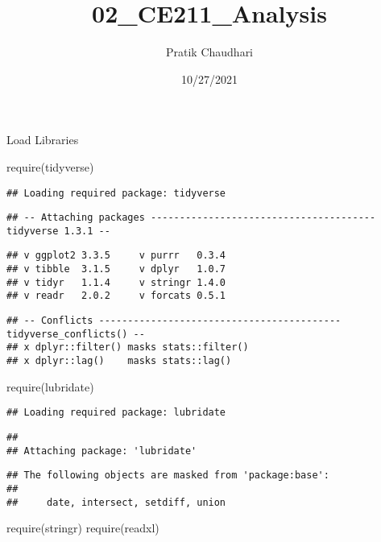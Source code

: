 \documentclass[
]{article}
\title{02\_CE211\_Analysis}
\author{Pratik Chaudhari}
\date{10/27/2021}
\newenvironment{Shaded}{\begin{snugshade}}{\end{snugshade}}
\newcommand{\FunctionTok}[1]{\textcolor[rgb]{0.00,0.00,0.00}{#1}}
\newcommand{\NormalTok}[1]{#1}
\begin{document}
\maketitle

Load Libraries

\begin{Shaded}
\begin{Highlighting}[]
\FunctionTok{require}\NormalTok{(tidyverse)}
\end{Highlighting}
\end{Shaded}

\begin{verbatim}
## Loading required package: tidyverse
\end{verbatim}

\begin{verbatim}
## -- Attaching packages --------------------------------------- tidyverse 1.3.1 --
\end{verbatim}

\begin{verbatim}
## v ggplot2 3.3.5     v purrr   0.3.4
## v tibble  3.1.5     v dplyr   1.0.7
## v tidyr   1.1.4     v stringr 1.4.0
## v readr   2.0.2     v forcats 0.5.1
\end{verbatim}

\begin{verbatim}
## -- Conflicts ------------------------------------------ tidyverse_conflicts() --
## x dplyr::filter() masks stats::filter()
## x dplyr::lag()    masks stats::lag()
\end{verbatim}

\begin{Shaded}
\begin{Highlighting}[]
\FunctionTok{require}\NormalTok{(lubridate)}
\end{Highlighting}
\end{Shaded}

\begin{verbatim}
## Loading required package: lubridate
\end{verbatim}

\begin{verbatim}
## 
## Attaching package: 'lubridate'
\end{verbatim}

\begin{verbatim}
## The following objects are masked from 'package:base':
## 
##     date, intersect, setdiff, union
\end{verbatim}

\begin{Shaded}
\begin{Highlighting}[]
\FunctionTok{require}\NormalTok{(stringr)}
\FunctionTok{require}\NormalTok{(readxl)}
\end{Highlighting}
\end{Shaded}
\end{document}
